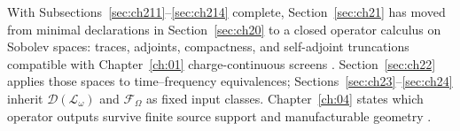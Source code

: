With Subsections~\ref{sec:ch211}--\ref{sec:ch214} complete, Section~\ref{sec:ch21} has moved from minimal declarations in Section~\ref{sec:ch20} to a closed operator calculus on Sobolev spaces: traces, adjoints, compactness, and self-adjoint truncations compatible with Chapter~\ref{ch:01} charge-continuous screens \cite{stratton1941}. Section~\ref{sec:ch22} applies those spaces to time--frequency equivalences; Sections~\ref{sec:ch23}--\ref{sec:ch24} inherit \(\mathcal{D}(\mathcal{L}_\omega)\) and \(\mathcal{F}_\Omega\) as fixed input classes. Chapter~\ref{ch:04} states which operator outputs survive finite source support and manufacturable geometry \cite{devaney2004}.
